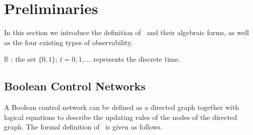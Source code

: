 \section{Preliminaries} 
\label{sec:pre}
In this section we introduce the definition of \BCNs\ and their algebraic forms, as well as the four existing types of observability. 

$\mathbb{B}$ : the set $\{0,1\}$; $t=0,1,\ldots$ represents the discrete time. 

\subsection{Boolean Control Networks}

A Boolean control network can be defined as a directed graph together with logical equations to describe the updating rules of the nodes of the directed graph. The formal definition of \BCN\ is given as follows. 

